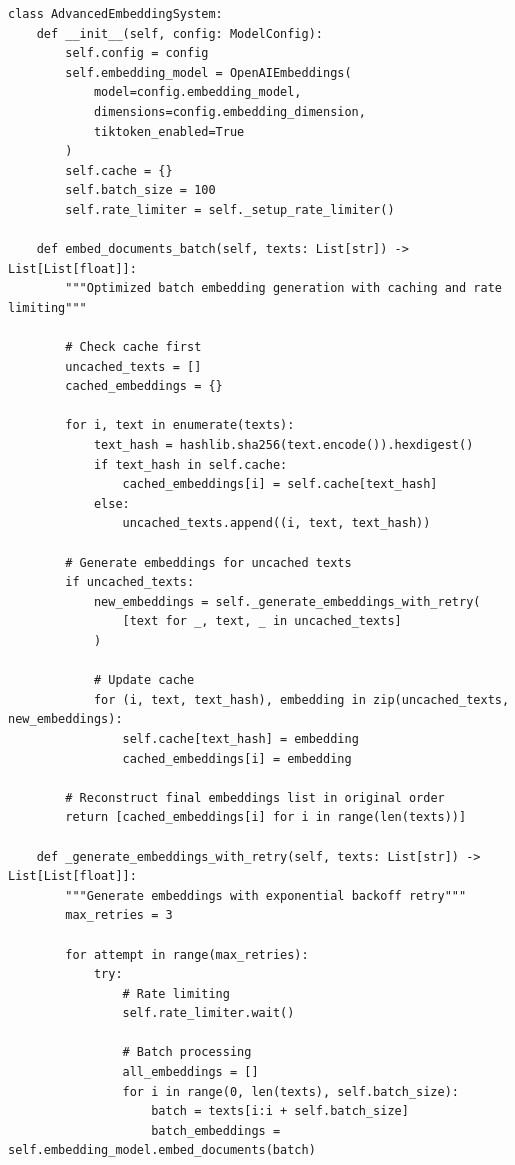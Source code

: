 \documentclass[12pt,a4paper]{article}
\begin{document}
\begin{lstlisting}[caption=Production-Ready Embedding System]
class AdvancedEmbeddingSystem:
    def __init__(self, config: ModelConfig):
        self.config = config
        self.embedding_model = OpenAIEmbeddings(
            model=config.embedding_model,
            dimensions=config.embedding_dimension,
            tiktoken_enabled=True
        )
        self.cache = {}
        self.batch_size = 100
        self.rate_limiter = self._setup_rate_limiter()
    
    def embed_documents_batch(self, texts: List[str]) -> List[List[float]]:
        """Optimized batch embedding generation with caching and rate limiting"""
        
        # Check cache first
        uncached_texts = []
        cached_embeddings = {}
        
        for i, text in enumerate(texts):
            text_hash = hashlib.sha256(text.encode()).hexdigest()
            if text_hash in self.cache:
                cached_embeddings[i] = self.cache[text_hash]
            else:
                uncached_texts.append((i, text, text_hash))
        
        # Generate embeddings for uncached texts
        if uncached_texts:
            new_embeddings = self._generate_embeddings_with_retry(
                [text for _, text, _ in uncached_texts]
            )
            
            # Update cache
            for (i, text, text_hash), embedding in zip(uncached_texts, new_embeddings):
                self.cache[text_hash] = embedding
                cached_embeddings[i] = embedding
        
        # Reconstruct final embeddings list in original order
        return [cached_embeddings[i] for i in range(len(texts))]
    
    def _generate_embeddings_with_retry(self, texts: List[str]) -> List[List[float]]:
        """Generate embeddings with exponential backoff retry"""
        max_retries = 3
        
        for attempt in range(max_retries):
            try:
                # Rate limiting
                self.rate_limiter.wait()
                
                # Batch processing
                all_embeddings = []
                for i in range(0, len(texts), self.batch_size):
                    batch = texts[i:i + self.batch_size]
                    batch_embeddings = self.embedding_model.embed_documents(batch)
                    

\end{lstlisting}
\end{document}
